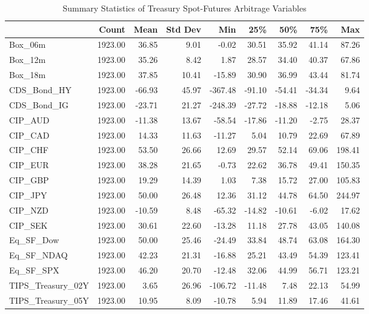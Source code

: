 \documentclass{article}
\begin{document}
\begin{table}[H]
\centering
\caption{Summary Statistics of Treasury Spot-Futures Arbitrage Variables}
\label{tab:summary_statistics}
\begin{adjustbox}{max width=\textwidth}
\begin{tabular}{lrrrrrrrr}
\toprule
 & \textbf{Count} & \textbf{Mean} & \textbf{Std Dev} & \textbf{Min} & \textbf{25\%} & \textbf{50\%} & \textbf{75\%} & \textbf{Max} \\
\midrule
Box\_06m & 1923.00 & 36.85 & 9.01 & -0.02 & 30.51 & 35.92 & 41.14 & 87.26 \\
Box\_12m & 1923.00 & 35.26 & 8.42 & 1.87 & 28.57 & 34.40 & 40.37 & 67.86 \\
Box\_18m & 1923.00 & 37.85 & 10.41 & -15.89 & 30.90 & 36.99 & 43.44 & 81.74 \\
CDS\_Bond\_HY & 1923.00 & -66.93 & 45.97 & -367.48 & -91.10 & -54.41 & -34.34 & 9.64 \\
CDS\_Bond\_IG & 1923.00 & -23.71 & 21.27 & -248.39 & -27.72 & -18.88 & -12.18 & 5.06 \\
CIP\_AUD & 1923.00 & -11.38 & 13.67 & -58.54 & -17.86 & -11.20 & -2.75 & 28.37 \\
CIP\_CAD & 1923.00 & 14.33 & 11.63 & -11.27 & 5.04 & 10.79 & 22.69 & 67.89 \\
CIP\_CHF & 1923.00 & 53.50 & 26.66 & 12.69 & 29.57 & 52.14 & 69.06 & 198.41 \\
CIP\_EUR & 1923.00 & 38.28 & 21.65 & -0.73 & 22.62 & 36.78 & 49.41 & 150.35 \\
CIP\_GBP & 1923.00 & 19.29 & 14.39 & 1.03 & 7.38 & 15.72 & 27.00 & 105.83 \\
CIP\_JPY & 1923.00 & 50.00 & 26.48 & 12.36 & 31.12 & 44.78 & 64.50 & 244.97 \\
CIP\_NZD & 1923.00 & -10.59 & 8.48 & -65.32 & -14.82 & -10.61 & -6.02 & 17.62 \\
CIP\_SEK & 1923.00 & 30.61 & 22.60 & -13.28 & 11.18 & 27.78 & 43.05 & 140.08 \\
Eq\_SF\_Dow & 1923.00 & 50.00 & 25.46 & -24.49 & 33.84 & 48.74 & 63.08 & 164.30 \\
Eq\_SF\_NDAQ & 1923.00 & 42.23 & 21.31 & -16.88 & 25.21 & 43.49 & 54.39 & 123.41 \\
Eq\_SF\_SPX & 1923.00 & 46.20 & 20.70 & -12.48 & 32.06 & 44.99 & 56.71 & 123.21 \\
TIPS\_Treasury\_02Y & 1923.00 & 3.65 & 26.96 & -106.72 & -11.48 & 7.48 & 22.13 & 54.99 \\
TIPS\_Treasury\_05Y & 1923.00 & 10.95 & 8.09 & -10.78 & 5.94 & 11.89 & 17.46 & 41.61 \\

\end{tabular}
\end{adjustbox}
\end{table}
\end{document}
